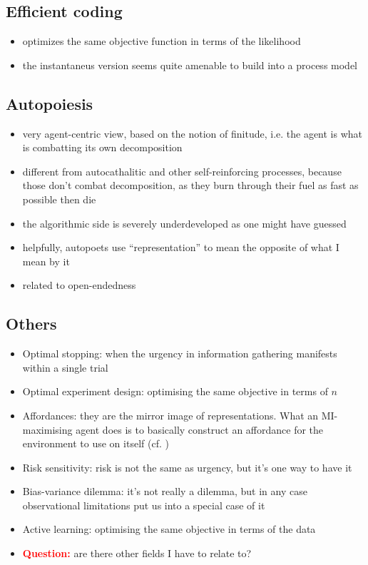 \documentclass{article}
\newcommand{\Q}{\textcolor{red}{\textbf{Question: }}}
\begin{document}
\subsection{Efficient coding} \label{sec:ec}

\begin{itemize}
    \item optimizes the same objective function in terms of the likelihood
    \item the instantaneus version\cite{mlynarski2022efficient} seems quite amenable to build into a process model 
\end{itemize}

\subsection{Autopoiesis}\label{seq:autopoiesis}

\begin{itemize}
    \item very agent-centric view, based on the notion of finitude, i.e. the agent is what is combatting its own decomposition
    \item different from autocathalitic and other self-reinforcing processes, because those don’t combat decomposition, as they burn through their fuel as fast as possible then die\cite{jaeger2024naturalizing}
    \item the algorithmic side is severely underdeveloped as one might have guessed
    \item helpfully, autopoets use “representation” to mean the opposite of what I mean by it
    \item related to open-endedness\cite{wang2020enhanced}
\end{itemize}

\subsection{Others}
\begin{itemize}
    \item Optimal stopping: when the urgency in information gathering manifests within a single trial
    \item Optimal experiment design: optimising the same objective in terms of $n$
    \item Affordances: they are the mirror image of representations. What an MI-maximising agent does is to basically construct an affordance for the environment to use on itself (cf. \cite{abel2025plasticity})
    \item Risk sensitivity: risk is not the same as urgency, but it's one way to have it
    \item Bias-variance dilemma: it's not really a dilemma, but in any case observational limitations put us into a special case of it
    \item Active learning: optimising the same objective in terms of the data
    \item \Q are there other fields I have to relate to?
\end{itemize}
\end{document}
